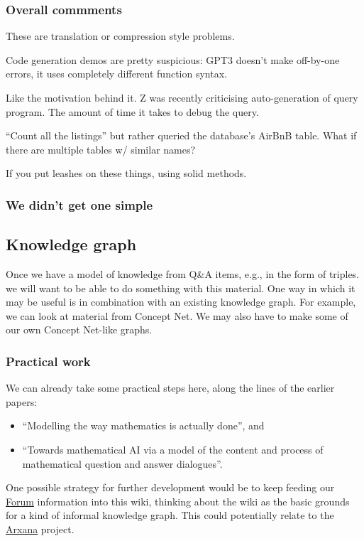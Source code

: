 \documentclass[11pt]{article}
\begin{document}
\subsubsection{Overall commments}
\label{sec:orgd3709b1}

These are translation or compression style problems.

Code generation demos are pretty suspicious: GPT3 doesn’t make
off-by-one errors, it uses completely different function syntax.

Like the motivation behind it. Z was recently criticising
auto-generation of query program. The amount of time it takes to debug
the query.

“Count all the listings” but rather queried the database’s AirBnB
table. What if there are multiple tables w/ similar names?

If you put leashes on these things, using solid methods. 

\subsubsection{We didn’t get one simple}
\label{sec:org4c89221}
\subsection{Knowledge graph}
\label{sec:org0520521}
Once we have a model of knowledge from Q\&A items, e.g., in the form of
triples. we will want to be able to do something with this material.
One way in which it may be useful is in combination with an existing
knowledge graph.  For example, we can look at material from Concept
Net.  We may also have to make some of our own Concept Net-like
graphs.

\subsubsection{Practical work}
\label{sec:org9dd720c}

We can already take some practical steps here, along the lines of the
earlier papers:

\begin{itemize}
\item ``Modelling the way mathematics is actually done'', and
\item ``Towards mathematical AI via a model of the content and process of mathematical question and answer dialogues''.
\end{itemize}

One possible strategy for further development would be to keep feeding
our \hyperref[sec:orgb61a99d]{Forum} information into this wiki, thinking about the wiki as the
basic grounds for a kind of informal knowledge graph.  This could
potentially relate to the \hyperref[sec:orge0a6a31]{Arxana} project.
\end{document}
